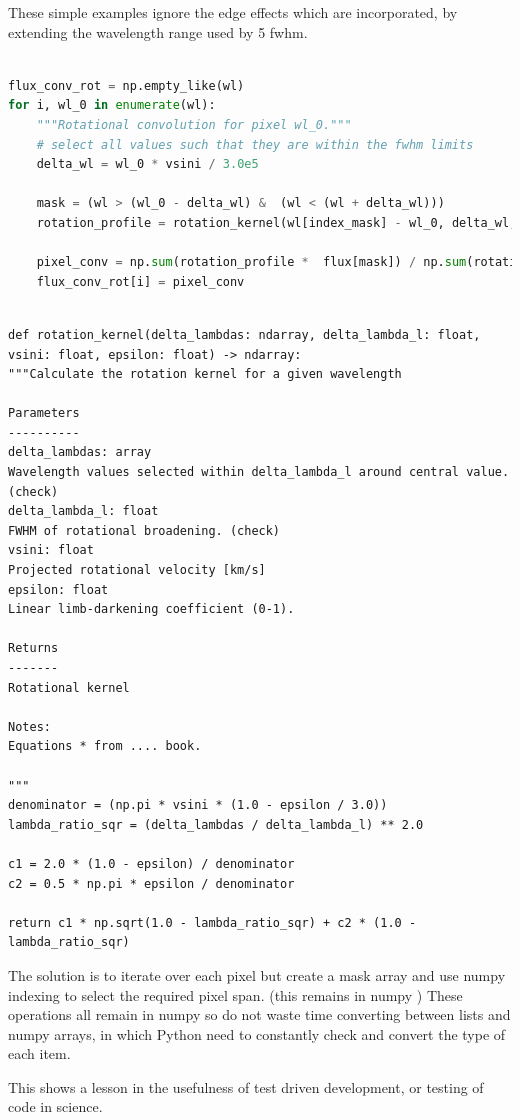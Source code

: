 These simple examples ignore the edge effects which are incorporated, by extending the wavelength range used by 5 fwhm.
\begin{lstlisting}[language=Python, caption=Python example]

flux_conv_rot = np.empty_like(wl)
for i, wl_0 in enumerate(wl):
    """Rotational convolution for pixel wl_0."""
    # select all values such that they are within the fwhm limits
    delta_wl = wl_0 * vsini / 3.0e5

    mask = (wl > (wl_0 - delta_wl) &  (wl < (wl + delta_wl)))
    rotation_profile = rotation_kernel(wl[index_mask] - wl_0, delta_wl, vsini, epsilon)

    pixel_conv = np.sum(rotation_profile *  flux[mask]) / np.sum(rotation_profile)
    flux_conv_rot[i] = pixel_conv

\end{lstlisting}


\begin{lstlisting}

def rotation_kernel(delta_lambdas: ndarray, delta_lambda_l: float, vsini: float, epsilon: float) -> ndarray:
"""Calculate the rotation kernel for a given wavelength

Parameters
----------
delta_lambdas: array
Wavelength values selected within delta_lambda_l around central value. (check)
delta_lambda_l: float
FWHM of rotational broadening. (check)
vsini: float
Projected rotational velocity [km/s]
epsilon: float
Linear limb-darkening coefficient (0-1).

Returns
-------
Rotational kernel

Notes:
Equations * from .... book.

"""
denominator = (np.pi * vsini * (1.0 - epsilon / 3.0))
lambda_ratio_sqr = (delta_lambdas / delta_lambda_l) ** 2.0

c1 = 2.0 * (1.0 - epsilon) / denominator
c2 = 0.5 * np.pi * epsilon / denominator

return c1 * np.sqrt(1.0 - lambda_ratio_sqr) + c2 * (1.0 - lambda_ratio_sqr)
\end{lstlisting}

The solution is to iterate over each pixel but create a mask array and use numpy indexing to select the required pixel span. (this remains in numpy )
These operations all remain in numpy so do not waste time converting between lists and numpy arrays, in which Python need to constantly check and convert the type of each item.

This shows a lesson in the usefulness of test driven development, or testing of code in science.


